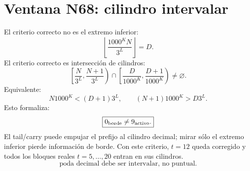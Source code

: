 
\section*{Ventana N68: cilindro intervalar}
El criterio correcto no es el extremo inferior:
\[
\left\lfloor\frac{1000^K N}{3^L}\right\rfloor=D.
\]
El criterio correcto es intersección de cilindros:
\[
\left[\frac N{3^L},\frac{N+1}{3^L}\right)
\cap
\left[\frac D{1000^K},\frac{D+1}{1000^K}\right)
\neq\varnothing.
\]
Equivalente:
\[
N1000^K<(D+1)3^L,
\qquad
(N+1)1000^K>D3^L.
\]
Esto formaliza:
\[
\boxed{0_{\rm borde}\neq9_{\rm activo}.}
\]
El tail/carry puede empujar el prefijo al cilindro decimal; mirar sólo el extremo inferior pierde información de borde.
Con este criterio, \(t=12\) queda corregido y todos los bloques reales \(t=5,\ldots,20\) entran en sus cilindros.
\[
\boxed{\text{poda decimal debe ser intervalar, no puntual.}}
\]
